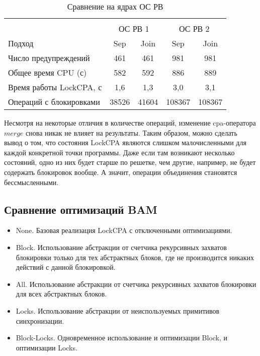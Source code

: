   \begin{table}[h]\footnotesize \centering
    \caption{Сравнение на ядрах ОС РВ}
  	\label{table-os-lock-merge}
    \begin{tabular}{ | l | c | c | c | c | }
      \hline
      		& 		\multicolumn{4}{c|}{\theory}  \\
      		& 		\multicolumn{2}{c|}{ОС РВ 1} & \multicolumn{2}{c|}{ОС РВ 2}  \\
      Подход         					& Sep 	& Join 	& Sep 	& Join   	\\ \hline
      Число предупреждений				& 461   & 461   & 981   & 981   	\\ 
  	  Общее время CPU (с) 				& 582 	& 592 	& 886   & 889     	\\ 
  \hspace{0.5cm} Время работы LockCPA, с & 1,6 	& 1,3 	& 3,0   & 3,1     	\\ \hline
   	  Операций с блокировками			& 38526 & 41604 & 108367 & 108367      	\\ 
      \hline
    \end{tabular}
  \end{table}


Несмотря на некоторые отличия в количестве операций, изменение cpa-оператора $merge$ снова никак не влияет на результаты.
Таким образом, можно сделать вывод о том, что состояния LockCPA являются слишком малочисленными для каждой конкретной точки программы.
Даже если там возникают несколько состояний, одно из них будет старше по решетке, чем другие, например, не будет содержать блокировок вообще. 
А значит, операции объединения становятся бессмысленными.

\subsection{Сравнение оптимизаций BAM}

\begin{itemize}
\item None. Базовая реализация LockCPA с отключенными оптимизациями.
\item Block. Использование абстракции от счетчика рекурсивных захватов блокировки только для тех абстрактных блоков, где не производится никаких действий с данной блокировкой.
\item All. Использование абстракции от счетчика рекурсивных захватов блокировки для всех абстрактных блоков.
\item Locks. Использование абстракции от неиспользуемых примитивов синхронизации.
\item Block-Locks. Одновременное использование и оптимизации Block, и оптимизации Locks.
\end{itemize}

